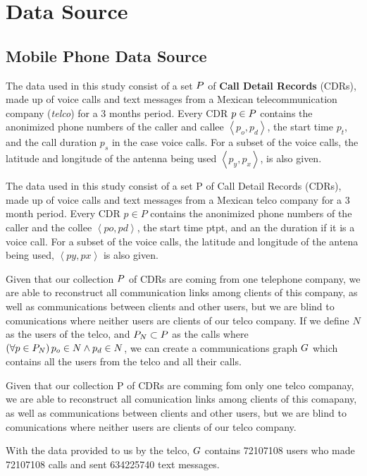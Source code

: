 \section{Data Source}

\subsection{Mobile Phone Data Source}

The data used in this study consist of a set \( \mathlarger{P} \) of \textbf{Call Detail Records} (CDRs), made up of voice calls and text messages from a Mexican telecommunication company (\textit{telco}) for a 3 months period.
Every CDR \( p \in \mathlarger{P} \)  contains the anonimized phone numbers of the caller and callee \( \left< p_o, p_d \right> \), the start time \( p_t \), and the call duration \( p_s \) in the case voice calls. 
For a subset of the voice calls, the latitude and longitude of the antenna being used \( \left< p_y, p_x \right> \), is also given.

The data used in this study consist of a set P of Call Detail Records (CDRs), made up of voice calls and text messages from a Mexican telco company for a 3 month period. Every CDR $ p \in P $ contains the anonimized phone numbers of the caller and the collee $ \left< po, pd \right> $, the start time ptpt, and an the duration if it is a voice call. For a subset of the voice calls, the latitude and longitude of the antena being used, $ \left< py, px \right> $ is also given.


Given that our collection \( \mathlarger{P} \) of CDRs are
coming from one telephone company, 
we are able to reconstruct all communication links among clients of this company, as well as communications between clients and other users, but we are blind to comunications where neither users are clients of our telco company.
If we define \( N \) as the users of the telco, and \( \mathlarger{P}_N \subset \mathlarger{P} \) as the calls where \( \left( \forall p \in \mathlarger{P}_N \right) p_o \in N \wedge p_d \in N \), we can create a communications graph \( \mathlarger{G} \) which contains all the users from the telco and all their calls.

Given that our collection P of CDRs are comming fom only one telco companay, we are able to reconstruct all comunication links among clients of this comapany, as well as communications between clients and other users, but we are blind to comunications where neither users are clients of our telco company.

With the data provided to us by the telco, \( \mathlarger{G} \) contains \num{72107108} users who made \num{72107108} calls and sent \num{634225740} text messages.
